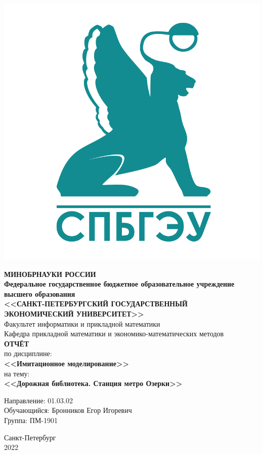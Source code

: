 \documentclass[14pt,fleqn]{extarticle}
\begin{document}
	\begin{titlepage}
		\includegraphics[scale=0.12]{logo}
		\begin{center}
			\textbf{МИНОБРНАУКИ РОССИИ}\\
			\vspace{0.2cm}
			\textbf{Федеральное государственное бюджетное образовательное учреждение высшего образования}\\
			\textbf{<<САНКТ-ПЕТЕРБУРГСКИЙ ГОСУДАРСТВЕННЫЙ ЭКОНОМИЧЕСКИЙ УНИВЕРСИТЕТ>>}\\
			\vspace{0.6cm}
			Факультет информатики и прикладной математики\\
			Кафедра прикладной математики и экономико-математических методов\\
			\vspace{1cm}
			\textbf{ОТЧЁТ}\\
			по дисциплине:\\
			\textbf{<<Имитационное моделирование>>}\\
			на тему:\\
			\textbf{<<Дорожная библиотека. Станция метро Озерки>>}\\
		\end{center}
		\vspace{1cm}
		Направление: 01.03.02\\
		Обучающийся: Бронников Егор Игоревич\\
		Группа: ПМ-1901\\
		\vfill
		\begin{center}
			Санкт-Петербург\\
			2022\\
		\end{center}
	\end{titlepage}
\end{document}
